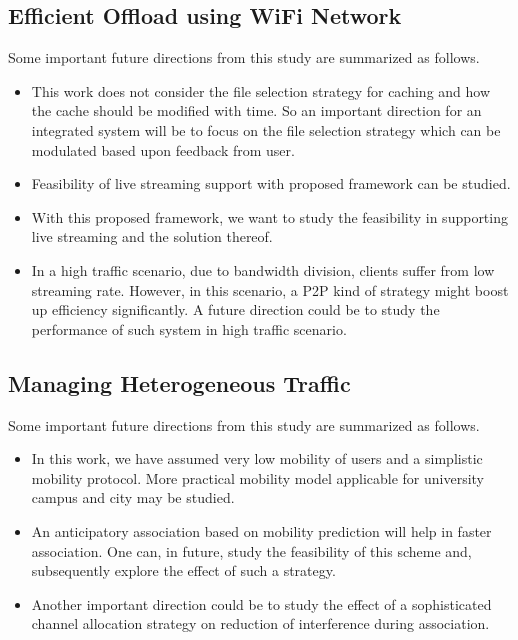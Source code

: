 \subsection{Efficient Offload using WiFi Network} Some important future directions from this study are summarized as follows.
\begin{itemize}
\item This work does not consider the file selection strategy for caching and how the cache should be modified with time. So an important direction for an integrated system will be to focus on the file selection strategy which can be modulated based upon feedback from user.\\
\item Feasibility of live streaming support with proposed framework can be studied.\\
\item With this proposed framework, we want to study the feasibility in supporting live streaming and the solution thereof.\\
\item In a high traffic scenario, due to bandwidth division, clients suffer from low streaming rate. However, in this scenario, a P2P kind of strategy might boost up efficiency significantly. A future direction could be to study the performance of such system in high traffic scenario.\\
\end{itemize}
\subsection{Managing Heterogeneous Traffic} Some important future directions from this study are summarized as follows.
\begin{itemize}
\item In this work, we have assumed very low mobility of users and a simplistic mobility protocol. More practical mobility model applicable for university campus and city may be studied.\\
\item An anticipatory association based on mobility prediction will help in faster association. One can, in future, study the feasibility of this scheme and, subsequently explore the effect of such a strategy.\\
\item Another important direction could be to study the effect of a sophisticated channel allocation strategy on reduction of interference during association.\\
\end{itemize}

